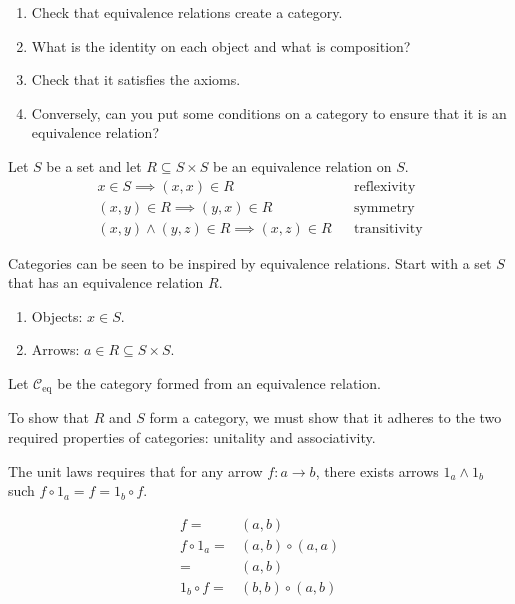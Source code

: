 \begin{ttta}
	\begin{enumerate}[label = {(\alph*)}]
		\item Check that equivalence relations create a category.
		\item What is the identity on each object and what is composition?
		\item Check that it satisfies the axioms.
		\item Conversely, can you put some conditions on a category to ensure that it is an equivalence relation?
	\end{enumerate}
\end{ttta}
\begin{proofitem}
	\item Let $S$ be a set and let $R\subseteq S\times S$ be an equivalence relation on $S$.
	\begin{align}
		x \in S \implies (x, x) \in R                  &  & \text{reflexivity}  \\
		(x,y) \in R \implies (y, x) \in R              &  & \text{symmetry}     \\
		(x,y) \land (y, z) \in R \implies (x, z) \in R &  & \text{transitivity}
	\end{align}
	\item
	Categories can be seen to be inspired by equivalence relations. Start with a set
	$S$ that has an equivalence relation $R$.
	\begin{enumerate}
		\item Objects: $x\in S$.
		\item Arrows: $a\in R\subseteq S\times S$.
	\end{enumerate}
	\item Let $\mathcal{C}_{\text{eq}}$ be the category formed from an equivalence
	relation.
	\item To show that $R$ and $S$ form a category, we must show that it adheres to
	the two required properties of categories: unitality and associativity.
	\item The unit laws requires that for any arrow $f:a \rightarrow b$, there
	exists arrows $1_a \land 1_b$ such $f\circ 1_a = f = 1_b \circ f$.
	\begin{figure}[H]
		\begin{align*}
			f=          & (a, b)            \\
			f\circ 1_a= & (a, b)\circ(a, a) \\
			=           & (a, b)            \\
			1_b\circ f= & (b, b)\circ(a, b) \\

\end{align*}
\end{figure}
\end{proofitem}

